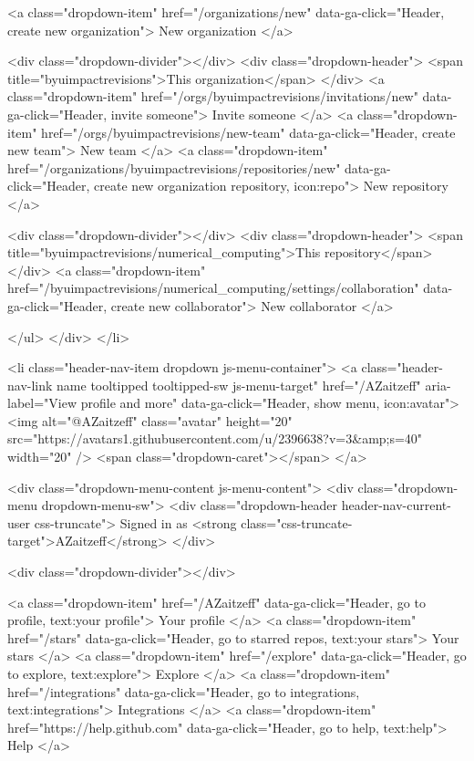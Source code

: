   <a class="dropdown-item" href="/organizations/new" data-ga-click="Header, create new organization">
    New organization
  </a>

  <div class="dropdown-divider"></div>
  <div class="dropdown-header">
    <span title="byuimpactrevisions">This organization</span>
  </div>
  <a class="dropdown-item" href="/orgs/byuimpactrevisions/invitations/new" data-ga-click="Header, invite someone">
    Invite someone
  </a>
  <a class="dropdown-item" href="/orgs/byuimpactrevisions/new-team" data-ga-click="Header, create new team">
    New team
  </a>
  <a class="dropdown-item" href="/organizations/byuimpactrevisions/repositories/new" data-ga-click="Header, create new organization repository, icon:repo">
    New repository
  </a>


  <div class="dropdown-divider"></div>
  <div class="dropdown-header">
    <span title="byuimpactrevisions/numerical_computing">This repository</span>
  </div>
    <a class="dropdown-item" href="/byuimpactrevisions/numerical_computing/settings/collaboration" data-ga-click="Header, create new collaborator">
      New collaborator
    </a>

      </ul>
    </div>
  </li>

  <li class="header-nav-item dropdown js-menu-container">
    <a class="header-nav-link name tooltipped tooltipped-sw js-menu-target" href="/AZaitzeff"
       aria-label="View profile and more"
       data-ga-click="Header, show menu, icon:avatar">
      <img alt="@AZaitzeff" class="avatar" height="20" src="https://avatars1.githubusercontent.com/u/2396638?v=3&amp;s=40" width="20" />
      <span class="dropdown-caret"></span>
    </a>

    <div class="dropdown-menu-content js-menu-content">
      <div class="dropdown-menu dropdown-menu-sw">
        <div class="dropdown-header header-nav-current-user css-truncate">
          Signed in as <strong class="css-truncate-target">AZaitzeff</strong>
        </div>

        <div class="dropdown-divider"></div>

        <a class="dropdown-item" href="/AZaitzeff" data-ga-click="Header, go to profile, text:your profile">
          Your profile
        </a>
        <a class="dropdown-item" href="/stars" data-ga-click="Header, go to starred repos, text:your stars">
          Your stars
        </a>
        <a class="dropdown-item" href="/explore" data-ga-click="Header, go to explore, text:explore">
          Explore
        </a>
          <a class="dropdown-item" href="/integrations" data-ga-click="Header, go to integrations, text:integrations">
            Integrations
          </a>
        <a class="dropdown-item" href="https://help.github.com" data-ga-click="Header, go to help, text:help">
          Help
        </a>


